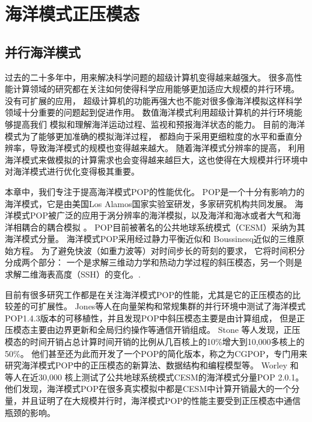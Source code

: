 \chapter{海洋模式正压模态}
\label{cha:related}
\section{并行海洋模式}
\label{solver:Backgroud} 

过去的二十多年中，用来解决科学问题的超级计算机变得越来越强大。 
很多高性能计算领域的研究都在关注如何使得科学应用能够更加适应大规模的并行环境。 
没有可扩展的应用， 超级计算机的功能再强大也不能对很多像海洋模拟这样科学领域十分重要的问题起到促进作用。 
数值海洋模式利用超级计算机的并行环境能够提高我们 模拟和理解海洋运动过程、监视和预报海洋状态的能力。 
目前的海洋模式为了能够更加准确的模拟海洋过程， 都趋向于采用更细粒度的水平和垂直分辨率，导致海洋模式的规模也变得越来越大。 
随着海洋模式分辨率的提高， 利用海洋模式来做模拟的计算需求也会变得越来越巨大，这也使得在大规模并行环境中对海洋模式进行优化变得极其重要。 


本章中，我们专注于提高海洋模式POP的性能优化。 
POP是一个十分有影响力的海洋模式，它是由美国Los Alamos国家实验室研发，多家研究机构共同发展。
海洋模式POP被广泛的应用于涡分辨率的海洋模拟\cite{mcclean2002eulerian, stark2004towards}，以及海洋和海冰或者大气和海洋相耦合的耦合模拟  \cite{May2002preliminary}。 
POP目前被著名的公共地球系统模式（CESM）采纳为其海洋模式分量。  
海洋模式POP采用经过静力平衡近似和  Boussinesq近似的三维原始方程。 
为了避免快波（如重力波等）对时间步长的苛刻的要求， 它将时间积分分成两个部分： 一个是求解三维动力学和热动力学过程的斜压模态，另一个则是求解二维海表高度（SSH）的变化。\cite{smith2010parallel}.

目前有很多研究工作都是在关注海洋模式POP的性能，尤其是它的正压模态的比较差的可扩展性。 
Jones\cite{pop05}等人在向量架构和常规集群的并行环境中测试了海洋模式POP1.4.3版本的可移植性，并且发现POP中斜压模态主要是由计算组成， 但是正压模态主要由边界更新和全局归约操作等通信开销组成。
Stone  \cite{stone2011cgpop}等人发现，正压模态的时间开销占总计算时间开销的比例从几百核上的10\%增大到10,000多核上的50\%。 
他们甚至还为此而开发了一个POP的简化版本，称之为CGPOP，专门用来研究海洋模式POP中的正压模态的新算法、数据结构和编程模型等。 
Worley  \cite{Worley:2011:PCE:2063384.2063457} 和 \cite{dennis2012computational} 等人在近30,000 核上测试了公共地球系统模式CESM的海洋模式分量POP 2.0.1。 
他们发现，海洋模式POP在很多真实模拟中都是CESM中计算开销最大的一个分量，并且证明了在大规模并行时，海洋模式POP的性能主要受到正压模态中通信瓶颈的影响。 
 

